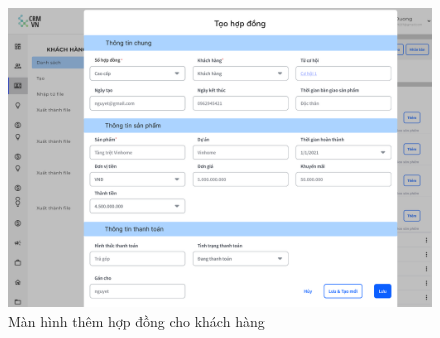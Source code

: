 \documentclass[12pt,a4paper]{article}
\begin{document}
\begin{enumerate}
\begin{itemize}
            \begin{figure}[H]
                \centering \includegraphics[width=\textwidth]{Img/Nguyet/Khachhang/taohopdongKH.png}
                \vspace{0.5cm}
                \caption{Màn hình thêm hợp đồng cho khách hàng}
                \label{themHDKH}
            \end{figure}
        \end{itemize}


\end{enumerate}
\end{document}
